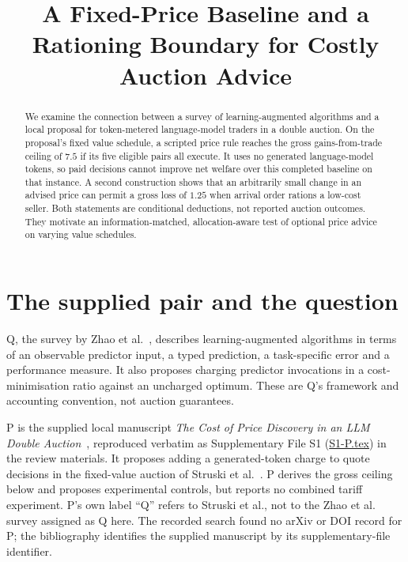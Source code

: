 \documentclass{article}
\title{A Fixed-Price Baseline and a Rationing Boundary for Costly Auction Advice}
\begin{document}
\maketitle

\begin{abstract}
We examine the connection between a survey of learning-augmented algorithms and a local proposal for
token-metered language-model traders in a double auction. On the proposal's fixed value schedule, a scripted
price rule reaches the gross gains-from-trade ceiling of \(7.5\) if its five eligible pairs all execute. It
uses no generated language-model tokens, so paid decisions cannot improve net welfare over this completed
baseline on that instance. A second construction shows that an arbitrarily small change in an advised price
can permit a gross loss of \(1.25\) when arrival order rations a low-cost seller. Both statements are
conditional deductions, not reported auction outcomes. They motivate an information-matched,
allocation-aware test of optional price advice on varying value schedules.
\end{abstract}

\section{The supplied pair and the question}

Q, the survey by Zhao et al.~\cite{zhao2026laa}, describes learning-augmented algorithms in terms of an
observable predictor input, a typed prediction, a task-specific error and a performance measure. It also
proposes charging predictor invocations in a cost-minimisation ratio against an uncharged optimum. These are
Q's framework and accounting convention, not auction guarantees.

P is the supplied local manuscript \emph{The Cost of Price Discovery in an LLM Double
Auction}~\cite{pathfinder2026p}, reproduced verbatim as Supplementary File S1
(\href{S1-P.tex}{S1-P.tex}) in the review materials. It proposes adding a generated-token charge to quote decisions in the
fixed-value auction of Struski et al.~\cite{struski2026market}. P derives the gross ceiling below and
proposes experimental controls, but reports no combined tariff experiment. P's own label ``Q'' refers to
Struski et al., not to the Zhao et al. survey assigned as Q here. The recorded search found no arXiv or DOI
record for P; the bibliography identifies the supplied manuscript by its supplementary-file identifier.
\end{document}
